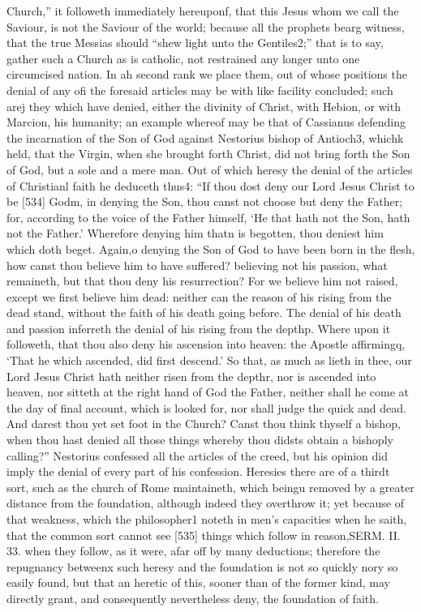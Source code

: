 Church,” it followeth immediately hereuponf, that this Jesus whom we call the Saviour, is not the Saviour of the world; because all the prophets bearg witness, that the true Messias should “shew light unto the Gentiles2;” that is to say, gather such a Church as is catholic, not restrained any longer unto one circumcised nation. In ah second rank we place them, out of whose positions the denial of any ofi the foresaid articles may be with like facility concluded; such arej they which have denied, either the divinity of Christ, with Hebion, or with Marcion, his humanity; an example whereof may be that of Cassianus defending the incarnation of the Son of God against Nestorius bishop of Antioch3, whichk held, that the Virgin, when she brought forth Christ, did not bring forth the Son of God, but a sole and a mere man. Out of which heresy the denial of the articles of Christianl faith he deduceth thus4: “If thou dost deny our Lord Jesus Christ to be [534] Godm, in denying the Son, thou canst not choose but deny the Father; for, according to the voice of the Father himself, ‘He that hath not the Son, hath not the Father.’ Wherefore denying him thatn is begotten, thou deniest him which doth beget. Again,o denying the Son of God to have been born in the flesh, how canst thou believe him to have suffered? believing not his passion, what remaineth, but that thou deny his resurrection? For we believe him not raised, except we first believe him dead: neither can the reason of his rising from the dead stand, without the faith of his death going before. The denial of his death and passion inferreth the denial of his rising from the depthp. Where upon it followeth, that thou also deny his ascension into heaven: the Apostle affirmingq, ‘That he which ascended, did first descend.’ So that, as much as lieth in thee, our Lord Jesus Christ hath neither risen from the depthr, nor is ascended into heaven, nor sitteth at the right hand of God the Father, neither shall he come at the day of final account, which is looked for, nor shall judge the quick and dead. And darest thou yet set foot in the Church? Canst thou think thyself a bishop, when thou hast denied all those things whereby thou didsts obtain a bishoply calling?” Nestorius confessed all the articles of the creed, but his opinion did imply the denial of every part of his confession. Heresies there are of a thirdt sort, such as the church of Rome maintaineth, which beingu removed by a greater distance from the foundation, although indeed they overthrow it; yet because of that weakness, which the philosopher1 noteth in men’s capacities when he saith, that the common sort cannot see [535] things which follow in reason,SERM. II. 33. when they follow, as it were, afar off by many deductions; therefore the repugnancy betweenx such heresy and the foundation is not so quickly nory so easily found, but that an heretic of this, sooner than of the former kind, may directly grant, and consequently nevertheless deny, the foundation of faith.

